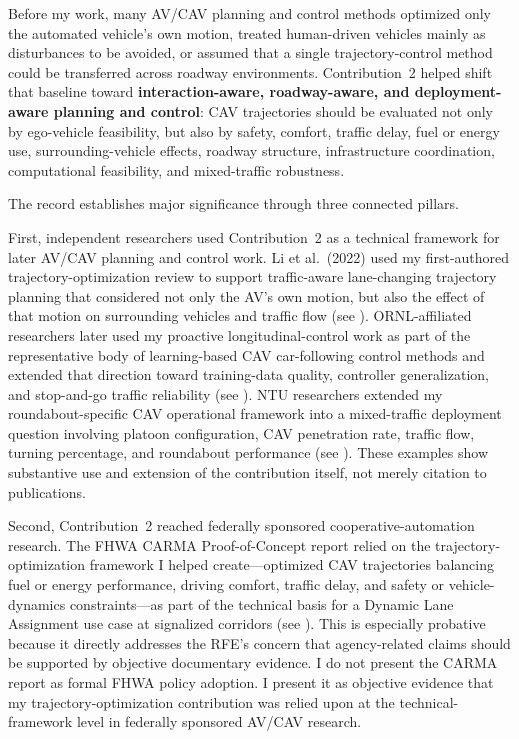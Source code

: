\documentclass[11pt,letterpaper]{article}
\begin{document}
Before my work, many AV/CAV planning and control methods optimized only the automated vehicle's own motion, treated human-driven vehicles mainly as disturbances to be avoided, or assumed that a single trajectory-control method could be transferred across roadway environments. Contribution~2 helped shift that baseline toward \textbf{interaction-aware, roadway-aware, and deployment-aware planning and control}: CAV trajectories should be evaluated not only by ego-vehicle feasibility, but also by safety, comfort, traffic delay, fuel or energy use, surrounding-vehicle effects, roadway structure, infrastructure coordination, computational feasibility, and mixed-traffic robustness.

The record establishes major significance through three connected pillars.

First, independent researchers used Contribution~2 as a technical framework for later AV/CAV planning and control work. Li et al.~(2022) used my first-authored trajectory-optimization review to support traffic-aware lane-changing trajectory planning that considered not only the AV's own motion, but also the effect of that motion on surrounding vehicles and traffic flow (see ). ORNL-affiliated researchers later used my proactive longitudinal-control work as part of the representative body of learning-based CAV car-following control methods and extended that direction toward training-data quality, controller generalization, and stop-and-go traffic reliability (see ). NTU researchers extended my roundabout-specific CAV operational framework into a mixed-traffic deployment question involving platoon configuration, CAV penetration rate, traffic flow, turning percentage, and roundabout performance (see ). These examples show substantive use and extension of the contribution itself, not merely citation to publications.

Second, Contribution~2 reached federally sponsored cooperative-automation research. The FHWA CARMA Proof-of-Concept report relied on the trajectory-optimization framework I helped create---optimized CAV trajectories balancing fuel or energy performance, driving comfort, traffic delay, and safety or vehicle-dynamics constraints---as part of the technical basis for a Dynamic Lane Assignment use case at signalized corridors (see ). This is especially probative because it directly addresses the RFE's concern that agency-related claims should be supported by objective documentary evidence. I do not present the CARMA report as formal FHWA policy adoption. I present it as objective evidence that my trajectory-optimization contribution was relied upon at the technical-framework level in federally sponsored AV/CAV research.
\end{document}

